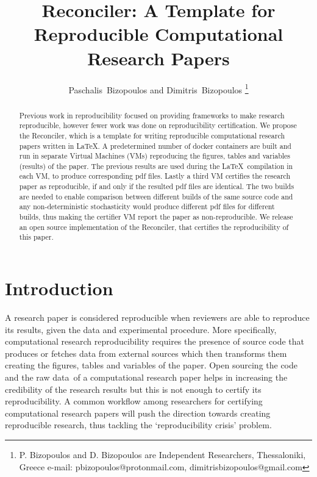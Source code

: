 \documentclass[journal]{IEEEtran}
\begin{document}

\title{Reconciler: A Template for Reproducible Computational Research Papers}

\author{Paschalis~Bizopoulos and Dimitris~Bizopoulos
\thanks{P. Bizopoulos and D. Bizopoulos are Independent Researchers, Thessaloniki, Greece e-mail: pbizopoulos@protonmail.com, dimitrisbizopoulos@gmail.com}}

\maketitle

\begin{abstract}
	Previous work in reproducibility focused on providing frameworks to make research reproducible, however fewer work was done on reproducibility certification.
	We propose the Reconciler, which is a template for writing reproducible computational research papers written in \LaTeX.
	A predetermined number of docker containers are built and run in separate Virtual Machines (VMs) reproducing the figures, tables and variables (results) of the paper.
	The previous results are used during the \LaTeX\ compilation in each VM, to produce corresponding pdf files.
	Lastly a third VM certifies the research paper as reproducible, if and only if the resulted pdf files are identical.
	The two builds are needed to enable comparison between different builds of the same source code and any non-deterministic stochasticity would produce different pdf files for different builds, thus making the certifier VM report the paper as non-reproducible.
	We release an open source implementation of the Reconciler, that certifies the reproducibility of this paper.
\end{abstract}

\section{Introduction}
A research paper is considered reproducible when reviewers are able to reproduce its results, given the data and experimental procedure.
More specifically, computational research reproducibility requires the presence of source code that produces or fetches data from external sources which then transforms them creating the figures, tables and variables of the paper.
Open sourcing the code and the raw data of a computational research paper helps in increasing the credibility of the research results but this is not enough to certify its reproducibility.
A common workflow among researchers for certifying computational research papers will push the direction towards creating reproducible research, thus tackling the `reproducibility crisis' problem.
\end{document}
